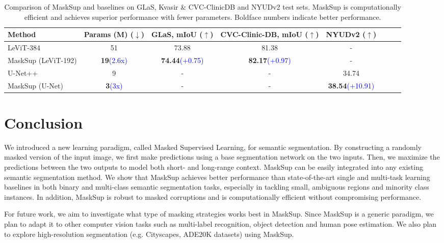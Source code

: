 \documentclass{bmvc2k}
\begin{document}
\begin{table}[!htb]
\caption{Comparison of MaskSup and baselines on GLaS, Kvasir \& CVC-ClinicDB and NYUDv2 test sets. MaskSup is computationally efficient and achieves superior performance with fewer parameters. Boldface numbers indicate better performance.}
\small
\setlength{\tabcolsep}{2.2pt}
\medskip
\centering
\begin{tabular}{l*{7}{c}}
\toprule
\textbf{Method} & Params (M) ($\downarrow$) & GLaS, mIoU ($\uparrow$) & CVC-Clinic-DB, mIoU ($\uparrow$) & NYUDv2 ($\uparrow$) \\
\midrule
LeViT-384~\cite{xu2021levit} & 51 & 73.88 & 81.38 & - \\
MaskSup (LeViT-192)  & \textbf{19}\textcolor{blue}{(2.6x)} & \textbf{74.44}\textcolor{blue}{(+0.75)} & \textbf{82.17}\textcolor{blue}{(+0.97)} & - \\
\midrule
U-Net++~\cite{zhou2019unet++} & 9 & - & - & 34.74 \\
MaskSup (U-Net) & \textbf{3}\textcolor{blue}{(3x)} & - & - & \textbf{38.54}\textcolor{blue}{(+10.91)}\\
\bottomrule
\end{tabular}
\label{Tab:scale}
\end{table}

\section{Conclusion}
We introduced a new learning paradigm, called Masked Supervised Learning, for semantic segmentation. By constructing a randomly masked version of the input image, we first make predictions using a base segmentation network on the two inputs. Then, we maximize the predictions between the two outputs to model both short- and long-range context. MaskSup can be easily integrated into any existing semantic segmentation method. We show that MaskSup achieves better performance than state-of-the-art single and multi-task learning baselines in both binary and multi-class semantic segmentation tasks, especially in tackling small, ambiguous regions and minority class instances. In addition, MaskSup is robust to masked corruptions and is computationally efficient without compromising performance.

For future work, we aim to investigate what type of masking strategies works best in MaskSup. Since MaskSup is a generic paradigm, we plan to adapt it to other computer vision tasks such as multi-label recognition, object detection and human pose estimation. We also plan to explore high-resolution segmentation (e.g. Cityscapes, ADE20K datasets) using MaskSup.


\end{document}
